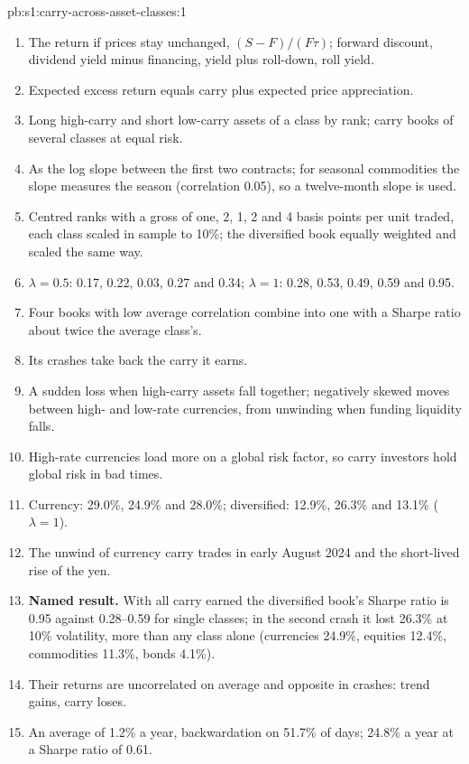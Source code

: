 \begin{solution}{pb:s1:carry-across-asset-classes:1}
\begin{enumerate}
\item The return if prices stay unchanged, $(S - F)/(F\tau)$; forward discount, dividend yield minus financing, yield plus roll-down, roll yield.
\item Expected excess return equals carry plus expected price appreciation.
\item Long high-carry and short low-carry assets of a class by rank; carry books of several classes at equal risk.
\item As the log slope between the first two contracts; for seasonal commodities the slope measures the season (correlation 0.05), so a twelve-month
slope is used.
\item Centred ranks with a gross of one, 2, 1, 2 and 4 basis points per unit traded, each class scaled in sample to 10\%; the diversified book equally
weighted and scaled the same way.
\item $\lambda = 0.5$: 0.17, 0.22, 0.03, 0.27 and 0.34; $\lambda = 1$: 0.28, 0.53, 0.49, 0.59 and 0.95.
\item Four books with low average correlation combine into one with a Sharpe ratio about twice the average class's.
\item Its crashes take back the carry it earns.
\item A sudden loss when high-carry assets fall together; negatively skewed moves between high- and low-rate currencies, from unwinding when funding
liquidity falls.
\item High-rate currencies load more on a global risk factor, so carry investors hold global risk in bad times.
\item Currency: 29.0\%, 24.9\% and 28.0\%; diversified: 12.9\%, 26.3\% and 13.1\% ($\lambda = 1$).
\item The unwind of currency carry trades in early August 2024 and the short-lived rise of the yen.
\item \textbf{Named result.} With all carry earned the diversified book's Sharpe ratio is 0.95 against 0.28--0.59 for single classes; in the second
crash it lost 26.3\% at 10\% volatility, more than any class alone (currencies 24.9\%, equities 12.4\%, commodities 11.3\%, bonds 4.1\%).
\item Their returns are uncorrelated on average and opposite in crashes: trend gains, carry loses.
\item An average of 1.2\% a year, backwardation on 51.7\% of days; 24.8\% a year at a Sharpe ratio of 0.61.

\end{enumerate}
\end{solution}
